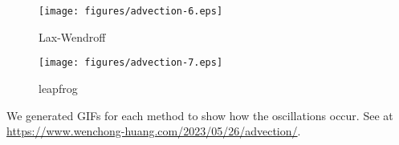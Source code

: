 \documentclass[twocolumn,10pt]{article}
\begin{document}
\vspace{-.3em}\begin{figure}[H]
    \centering
    \begin{minipage}[t]{0.48\linewidth}
        \centering
        \texttt{[image: figures/advection-6.eps]}
        \vspace{-.8em}
        \caption*{Lax-Wendroff}
    \end{minipage}
    \begin{minipage}[t]{0.48\linewidth}
        \centering
        \texttt{[image: figures/advection-7.eps]}
        \vspace{-.8em}
        \caption*{leapfrog}
    \end{minipage}
\end{figure} \vspace{-.5em}

We generated GIFs for each method to show how the oscillations occur. See at \url{https://www.wenchong-huang.com/2023/05/26/advection/}.
\end{document}
